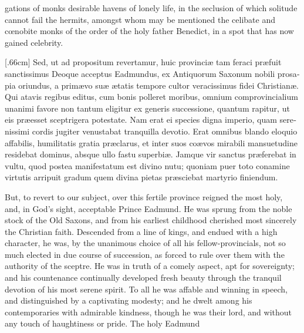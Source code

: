 \documentclass[10pt]{book}
\begin{document}
\vspace{-2\parskip}
\vspace{-3\lineskip}
gations of monks desirable havens of lonely life, in the seclusion of which solitude cannot fail the hermits, amongst whom may be mentioned the celibate and c\oe{}nobite monks of the order of the holy father Benedict, in a spot that has now gained celebrity.

\begin{paracol}{2}

\begin{otherlanguage}{latin}
\reversemarginpar
{}[.66cm]
Sed, ut ad propositum revertamur, huic provinci\ae{} tam feraci pr\ae{}fuit sanctissimus Deoque acceptus Eadmundus, ex Antiquorum Saxonum nobili prosapia oriundus, a prim\ae{}vo su\ae{} \ae{}tatis tempore cultor veracissimus fidei Christian\ae{}. Qui atavis regibus editus, cum bonis polleret moribus, omnium comprovincialium unanimi favore non tantum eligitur ex generis successione, quantum rapitur, ut eis pr\ae{}esset sceptrigera potestate. Nam erat ei species digna imperio, quam serenissimi cordis jugiter venustabat tranquilla devotio. Erat omnibus blando eloquio affabilis, humilitatis gratia pr\ae{}clarus, et inter suos co\ae{}vos mirabili mansuetudine residebat dominus, absque ullo fastu superbi\ae{}. Jamque vir sanctus pr\ae{}ferebat in vultu, quod postea manifestatum est divino nutu; quoniam puer toto conamine virtutis arripuit gradum quem divina pietas pr\ae{}sciebat martyrio finiendum.
\end{otherlanguage}

\switchcolumn

But, to revert to our subject, over this fertile province reigned the most holy, and, in God's sight, acceptable Prince Eadmund. He was sprung from the noble stock of the Old Saxons, and from his earliest childhood cherished most sincerely the Christian faith. Descended from a line of kings, and endued with a high character, he was, by the unanimous choice of all his fellow-provincials, not so much elected in due course of succession, as forced to rule over them with the authority of the sceptre. He was in truth of a comely aspect, apt for sovereignty; and his countenance continually developed fresh beauty through the tranquil devotion of his most serene spirit. To all he was affable and winning in speech, and distinguished by a captivating modesty; and he dwelt among his contemporaries with admirable kindness, though he was their lord, and without any touch of haughtiness or pride. The holy Eadmund\linebreak{} 

\end{paracol}
\end{document}
